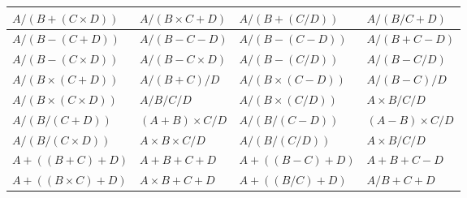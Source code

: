 \documentclass[11pt]{article}
\begin{document}
\begin{table}[htbp]
{\begin{tabular}{|l|l|l|l|}
$A/(B+(C \times D))$ & $A/(B \times C+D)$ & $A/(B+(C/D))$ & $A/(B/C+D)$  \\ \hline
$A/(B-(C+D))$ & $A/(B-C-D)$ & $A/(B-(C-D))$ & $A/(B+C-D)$  \\ \hline
$A/(B-(C \times D))$ & $A/(B-C \times D)$ & $A/(B-(C/D))$ & $A/(B-C/D)$  \\ \hline
$A/(B \times (C+D))$ & $A/(B+C)/D$ & $A/(B \times (C-D))$ & $A/(B-C)/D$  \\ \hline
$A/(B \times (C \times D))$ & $A/B/C/D$ & $A/(B \times (C/D))$ & $A \times B/C/D$  \\ \hline
$A/(B/(C+D))$ & $(A+B) \times C/D$ & $A/(B/(C-D))$ & $(A-B) \times C/D$  \\ \hline
$A/(B/(C \times D))$ & $A \times B \times C/D$ & $A/(B/(C/D))$ & $A \times B/C/D$  \\ \hline
$A+((B+C)+D)$ & $A+B+C+D$ & $A+((B-C)+D)$ & $A+B+C-D$  \\ \hline
$A+((B \times C)+D)$ & $A \times B+C+D$ & $A+((B/C)+D)$ & $A/B+C+D$  \\ \bottomrule
\end{tabular}
}
\end{table}
\end{document}
